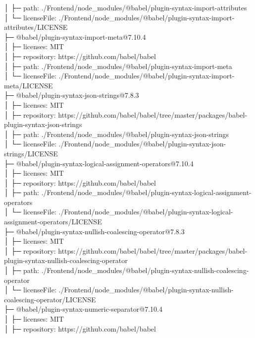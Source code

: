 │  ├─ path: ./Frontend/node\_modules/@babel/plugin-syntax-import-attributes\\
│  └─ licenseFile: ./Frontend/node\_modules/@babel/plugin-syntax-import-attributes/LICENSE\\
├─ @babel/plugin-syntax-import-meta@7.10.4\\
│  ├─ licenses: MIT\\
│  ├─ repository: https://github.com/babel/babel\\
│  ├─ path: ./Frontend/node\_modules/@babel/plugin-syntax-import-meta\\
│  └─ licenseFile: ./Frontend/node\_modules/@babel/plugin-syntax-import-meta/LICENSE\\
├─ @babel/plugin-syntax-json-strings@7.8.3\\
│  ├─ licenses: MIT\\
│  ├─ repository: https://github.com/babel/babel/tree/master/packages/babel-plugin-syntax-json-strings\\
│  ├─ path: ./Frontend/node\_modules/@babel/plugin-syntax-json-strings\\
│  └─ licenseFile: ./Frontend/node\_modules/@babel/plugin-syntax-json-strings/LICENSE\\
├─ @babel/plugin-syntax-logical-assignment-operators@7.10.4\\
│  ├─ licenses: MIT\\
│  ├─ repository: https://github.com/babel/babel\\
│  ├─ path: ./Frontend/node\_modules/@babel/plugin-syntax-logical-assignment-operators\\
│  └─ licenseFile: ./Frontend/node\_modules/@babel/plugin-syntax-logical-assignment-operators/LICENSE\\
├─ @babel/plugin-syntax-nullish-coalescing-operator@7.8.3\\
│  ├─ licenses: MIT\\
│  ├─ repository: https://github.com/babel/babel/tree/master/packages/babel-plugin-syntax-nullish-coalescing-operator\\
│  ├─ path: ./Frontend/node\_modules/@babel/plugin-syntax-nullish-coalescing-operator\\
│  └─ licenseFile: ./Frontend/node\_modules/@babel/plugin-syntax-nullish-coalescing-operator/LICENSE\\
├─ @babel/plugin-syntax-numeric-separator@7.10.4\\
│  ├─ licenses: MIT\\
│  ├─ repository: https://github.com/babel/babel\\
